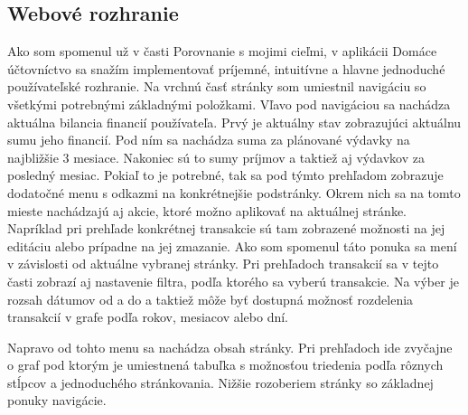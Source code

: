 \documentclass[12pt,oneside]{book}
\begin{document}
\subsection{Webové rozhranie}
Ako som spomenul už v časti Porovnanie s mojimi cieľmi, v aplikácii Domáce účtovníctvo sa snažím implementovať príjemné, intuitívne a hlavne jednoduché používateľské rozhranie. Na vrchnú časť stránky som umiestnil navigáciu so všetkými potrebnými základnými položkami. Vľavo pod navigáciou sa nachádza aktuálna bilancia financií používateľa. Prvý je aktuálny stav zobrazujúci aktuálnu sumu jeho financií. Pod ním sa nachádza suma za plánované výdavky na najbližšie 3 mesiace. Nakoniec sú to sumy príjmov a taktiež aj výdavkov za posledný mesiac. Pokiaľ to je potrebné, tak sa pod týmto prehľadom zobrazuje dodatočné menu s odkazmi na konkrétnejšie podstránky. Okrem nich sa na tomto mieste nachádzajú aj akcie, ktoré možno aplikovať na aktuálnej stránke. Napríklad pri prehľade konkrétnej transakcie sú tam zobrazené možnosti na jej editáciu alebo prípadne na jej zmazanie. Ako som spomenul táto ponuka sa mení v závislosti od aktuálne vybranej stránky. Pri prehľadoch transakcií sa v tejto časti zobrazí aj nastavenie filtra, podľa ktorého sa vyberú transakcie. Na výber je rozsah dátumov od a do a taktiež môže byť dostupná možnosť rozdelenia transakcií v grafe podľa rokov, mesiacov alebo dní.

Napravo od tohto menu sa nachádza obsah stránky. Pri prehľadoch ide zvyčajne o graf pod ktorým je umiestnená tabuľka s možnosťou triedenia podľa rôznych stĺpcov a jednoduchého stránkovania. Nižšie rozoberiem stránky so základnej ponuky navigácie. 
\end{document}
